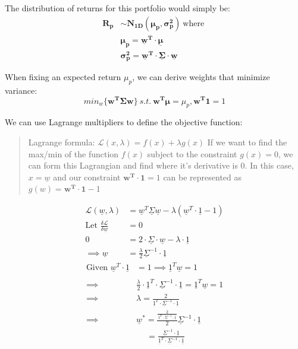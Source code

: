 \documentclass[
  oneside]{book}
\begin{document}
The distribution of returns for this portfolio would simply be:
\[
\begin{aligned}
\mathbf{R_{p}} &\sim \mathbf{N_{1D}(\mu_{p}, \sigma_{p}^{2})} \ \text{where }\\
&\mathbf{\mu_{p} = \underline{w}^{T}\cdot \underline{\mu}}\\
&\mathbf{\sigma_{p}^{2}=\underline{w}^{T}\cdot\underline{\Sigma}\cdot\underline{w}}
\end{aligned}
\]

When fixing an expected return \(\mu_{p}\), we can derive weights that minimize variance:
\[
min_{w}\{\mathbf{w^{T}\Sigma w}\}\ s.t. \ \mathbf{w^{T}\mu} = \mu_{p}, \mathbf{w^{T}1} = 1
\]

We can use Lagrange multipliers to define the objective function:

\begin{quote}
Lagrange formula: \(\mathcal{L}(x,\lambda) = f(x)+\lambda g(x)\)
If we want to find the max/min of the function \(f(x)\) subject to the constraint \(g(x) = 0\), we can form this Lagrangian and find where it's derivative is 0. In this case, \(x=\underline{w}\) and our constraint \(\mathbf{w^{T}\cdot 1} = 1\) can be represented as \(g(w) = \mathbf{w^{T}\cdot 1} -1\)
\end{quote}

\[
\begin{aligned}
\mathcal{L}(\underline{w},\lambda) &= \underline{w}^{T}\underline{\Sigma}\underline{w} - \lambda(\underline{w}^{T}\cdot \underline{1}-1)\\
\text{Let }\frac{\delta\mathcal{L}}{\delta \underline{w}}&= 0\\
0 &= 2\cdot\underline{\Sigma}\cdot \underline{w}-\lambda\cdot  \underline{1} \\
\implies \underline{w} &= \frac{\lambda}{2}\underline{\Sigma}^{-1}\cdot \underline{1}
\end{aligned}
\]
\[
\begin{aligned}
\text{Given } \underline{w}^{T}\cdot  \underline{1} &= 1 \implies  \underline{1}^{T}\underline{w} = 1\\ \\
\implies& \frac{\lambda}{2}\cdot   \underline{1}^{T}\cdot\underline{\Sigma}^{-1}\cdot  \underline{1} = \underline{1}^{T}\underline{w}  = 1\\
\implies& \lambda = \frac{2}{\underline{1}^{T}\cdot\underline{\Sigma}^{-1}\cdot  \underline{1}}\\
\implies &\underline{w}^{*} = \frac{\frac{2}{\underline{1}^{T}\cdot\underline{\Sigma}^{-1}\cdot  \underline{1}}}{2}\underline{\Sigma}^{-1}\cdot \underline{1}\\
& \quad \ = \frac{\underline{\Sigma}^{-1}\cdot \underline{1}}{\underline{1}^{T}\cdot\underline{\Sigma}^{-1}\cdot  \underline{1}}
\end{aligned}
\]
\end{document}
